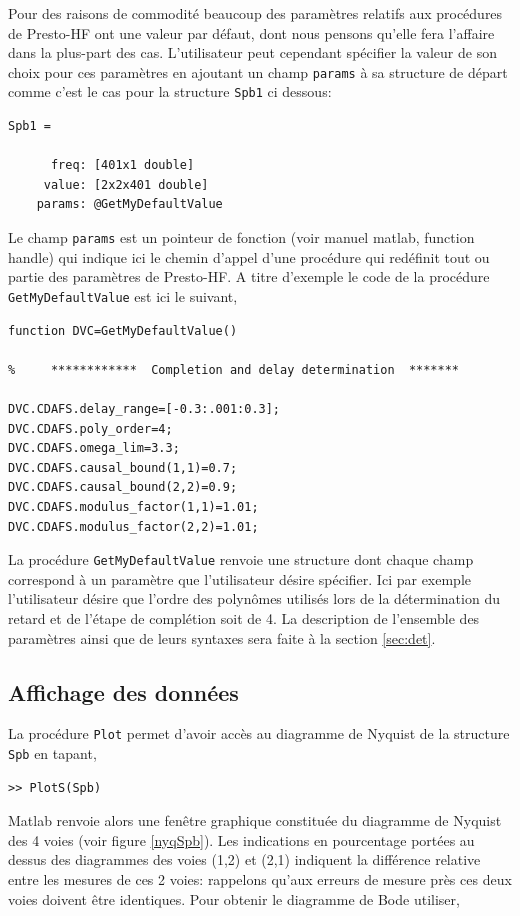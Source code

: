 \documentclass[12]{article}
\def\prest{Presto-HF\xspace}
\begin{document}
Pour des raisons de commodit\'e beaucoup des param\`etres relatifs aux
proc\'edures de \prest ont une valeur par d\'efaut, dont nous pensons
qu'elle \og fera l'affaire \fg dans la plus-part des cas. L'utilisateur peut
cependant sp\'ecifier la valeur de son choix pour ces param\`etres en
ajoutant un champ \verb+params+ \`a sa structure de d\'epart comme c'est 
le cas pour la structure \verb+Spb1+ ci dessous:
\begin{verbatim}
Spb1 = 

      freq: [401x1 double]
     value: [2x2x401 double]
    params: @GetMyDefaultValue
\end{verbatim}
Le champ \verb+params+ est un pointeur de fonction (voir manuel matlab,
function handle) 
qui indique ici le chemin d'appel d'une proc\'edure qui red\'efinit tout 
ou partie des param\`etres de \prest. A titre d'exemple le code de la
proc\'edure \verb+GetMyDefaultValue+ est ici le suivant,
\begin{verbatim}
function DVC=GetMyDefaultValue()

%     ************  Completion and delay determination  *******

DVC.CDAFS.delay_range=[-0.3:.001:0.3];
DVC.CDAFS.poly_order=4;
DVC.CDAFS.omega_lim=3.3;
DVC.CDAFS.causal_bound(1,1)=0.7;
DVC.CDAFS.causal_bound(2,2)=0.9;
DVC.CDAFS.modulus_factor(1,1)=1.01;
DVC.CDAFS.modulus_factor(2,2)=1.01;

\end{verbatim}
La proc\'edure \verb+GetMyDefaultValue+ renvoie une structure dont
chaque champ correspond \`a un param\`etre que l'utilisateur d\'esire
sp\'ecifier. Ici par exemple l'utilisateur d\'esire que l'ordre des
polyn\^omes utilis\'es lors de la d\'etermination du retard et de l'\'etape
de compl\'etion soit de 4. La description de l'ensemble des param\`etres
ainsi que de leurs syntaxes sera faite \`a la section \ref{sec:det}.

\subsection{Affichage des donn\'ees}

La proc\'edure \verb+Plot+ permet d'avoir acc\`es au diagramme de Nyquist de
la structure \verb+Spb+ en tapant,

\begin{verbatim}
>> PlotS(Spb)
\end{verbatim}

Matlab renvoie alors une fen\^etre graphique constitu\'ee du diagramme de
Nyquist des 4 voies (voir figure \ref{nyqSpb}). Les indications en pourcentage port\'ees au dessus des
diagrammes des voies (1,2) et (2,1) indiquent la diff\'erence relative entre 
 les mesures de ces 2 voies: rappelons qu'aux erreurs de mesure pr\`es ces deux voies
doivent \^etre identiques. Pour obtenir le diagramme de Bode utiliser,
\end{document}

